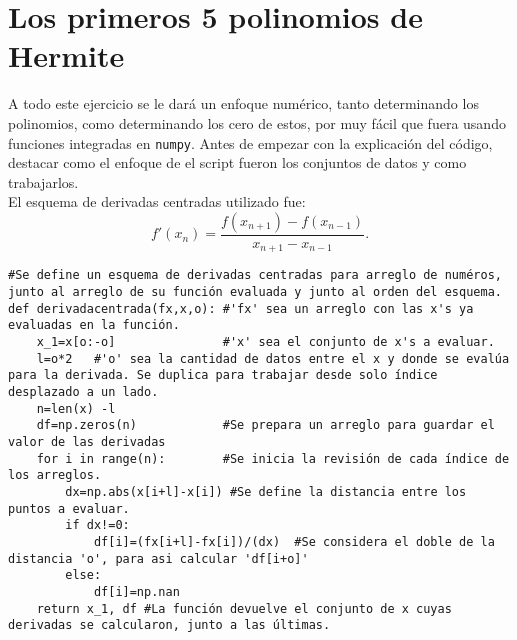 \documentclass[../portafolio.tex]{subfiles}
\begin{document}
\section{Los primeros 5 polinomios de Hermite}
A todo este ejercicio se le dará un enfoque numérico, tanto determinando los polinomios, como determinando los cero de estos, por muy fácil que fuera usando funciones integradas en \texttt{numpy}. Antes de empezar con la explicación del código, destacar como el enfoque de el script fueron los conjuntos de datos y como trabajarlos.\\
El esquema de derivadas centradas utilizado fue:
\begin{equation}
f'(x_n)=\frac{f(x_{n+1})-f(x_{n-1})}{x_{n+1}-x_{n-1}}.
\end{equation}
\begin{verbatim}
#Se define un esquema de derivadas centradas para arreglo de numéros, junto al arreglo de su función evaluada y junto al orden del esquema.
def derivadacentrada(fx,x,o): #'fx' sea un arreglo con las x's ya evaluadas en la función.
    x_1=x[o:-o]               #'x' sea el conjunto de x's a evaluar.
    l=o*2   #'o' sea la cantidad de datos entre el x y donde se evalúa para la derivada. Se duplica para trabajar desde solo índice desplazado a un lado.
    n=len(x) -l
    df=np.zeros(n)            #Se prepara un arreglo para guardar el valor de las derivadas
    for i in range(n):        #Se inicia la revisión de cada índice de los arreglos.
        dx=np.abs(x[i+l]-x[i]) #Se define la distancia entre los puntos a evaluar.
        if dx!=0:
            df[i]=(fx[i+l]-fx[i])/(dx)  #Se considera el doble de la distancia 'o', para asi calcular 'df[i+o]'
        else:
            df[i]=np.nan
    return x_1, df #La función devuelve el conjunto de x cuyas derivadas se calcularon, junto a las últimas.
\end{verbatim}
\end{document}
